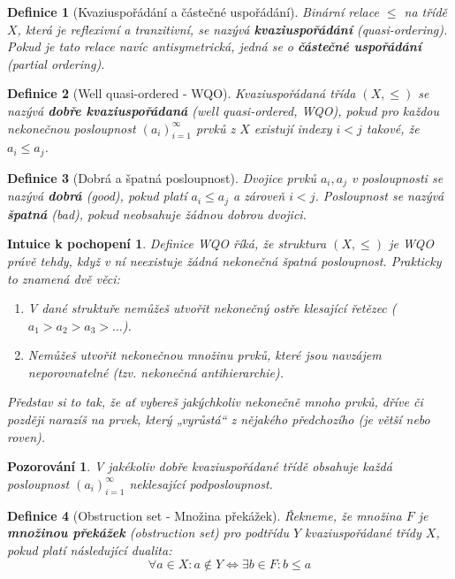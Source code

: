 \documentclass[a4paper,11pt]{article}
\newtheorem{definition}{Definice}[section]
\newtheorem{observation}{Pozorování}[section]
\newtheorem*{intuition}{Intuice k pochopení}
\begin{document}
\begin{definition}[Kvaziuspořádání a částečné uspořádání]
Binární relace $\le$ na třídě $X$, která je reflexivní a tranzitivní, se nazývá \textbf{kvaziuspořádání} (quasi-ordering). Pokud je tato relace navíc antisymetrická, jedná se o \textbf{částečné uspořádání} (partial ordering).
\end{definition}

\begin{definition}[Well quasi-ordered - WQO]
Kvaziuspořádaná třída $(X, \le)$ se nazývá \textbf{dobře kvaziuspořádaná} (well quasi-ordered, WQO), pokud pro každou nekonečnou posloupnost $(a_i)_{i=1}^{\infty}$ prvků z $X$ existují indexy $i < j$ takové, že $a_i \le a_j$.
\end{definition}

\begin{definition}[Dobrá a špatná posloupnost]
Dvojice prvků $a_i, a_j$ v posloupnosti se nazývá \textbf{dobrá} (good), pokud platí $a_i \le a_j$ a zároveň $i < j$. Posloupnost se nazývá \textbf{špatná} (bad), pokud neobsahuje žádnou dobrou dvojici.
\end{definition}

\begin{intuition}
Definice WQO říká, že struktura $(X, \le)$ je WQO právě tehdy, když v ní neexistuje žádná nekonečná \textit{špatná} posloupnost. Prakticky to znamená dvě věci:
\begin{enumerate}
    \item V dané struktuře nemůžeš utvořit nekonečný ostře klesající řetězec ($a_1 > a_2 > a_3 > \dots$).
    \item Nemůžeš utvořit nekonečnou množinu prvků, které jsou navzájem neporovnatelné (tzv. nekonečná antihierarchie).
\end{enumerate}
Představ si to tak, že ať vybereš jakýchkoliv nekonečně mnoho prvků, dříve či později narazíš na prvek, který „vyrůstá“ z nějakého předchozího (je větší nebo roven).
\end{intuition}

\begin{observation}
V jakékoliv dobře kvaziuspořádané třídě obsahuje každá posloupnost $(a_i)_{i=1}^{\infty}$ neklesající podposloupnost.
\end{observation}

\begin{definition}[Obstruction set - Množina překážek]
Řekneme, že množina $F$ je \textbf{množinou překážek} (obstruction set) pro podtřídu $Y$ kvaziuspořádané třídy $X$, pokud platí následující dualita:
$$\forall a \in X: a \notin Y \iff \exists b \in F: b \le a$$

\end{definition}
\end{document}
